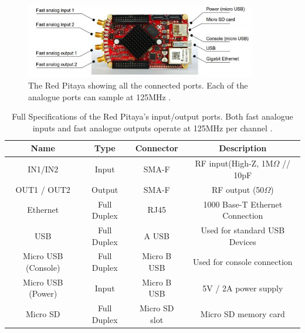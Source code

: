 \documentclass[12pt,a4paper,oneside]{report}
\begin{document}

\begin{figure}[H]
\includegraphics[width=0.9\textwidth, center,angle=0]{Images/RP.JPG}
\caption{The Red Pitaya showing all the connected ports. Each of the analogue ports can sample at 125MHz \cite[p.~7]{Leban2014RedManual}.}
\label{RP}
\end{figure}

\begin{table}[H]
	\setlength\arrayrulewidth{1pt}
    \begin{tabular}{ c c c c } 
        Name & Type & Connector & Description\\
        \hline
        IN1/IN2 & Input & SMA-F & RF input(High-Z, 1M$\Omega$ // 10pF\\[1pt]
        OUT1 / OUT2 & Output & SMA-F & RF output (50$\Omega$)\\[1pt]
        Ethernet & Full Duplex & RJ45 & 1000 Base-T Ethernet Connection\\[1pt]
        USB & Full Duplex & A USB & Used for standard USB Devices\\[1pt]
        Micro USB (Console) & Full Duplex & Micro B USB & Used for console connection\\[1pt]
        Micro USB (Power) & Input & Micro B USB & 5V / 2A power supply\\[1pt]
        Micro SD & Full Duplex & Micro SD slot & Micro SD memory card\\
    \end{tabular}
    \caption{Full Specifications of the Red Pitaya's input/output ports. Both fast analogue inputs and fast analogue outputs operate at 125MHz per channel \cite[p.~7]{Leban2014RedManual}.}
    \label{RPspec}
\end{table}
\end{document}
